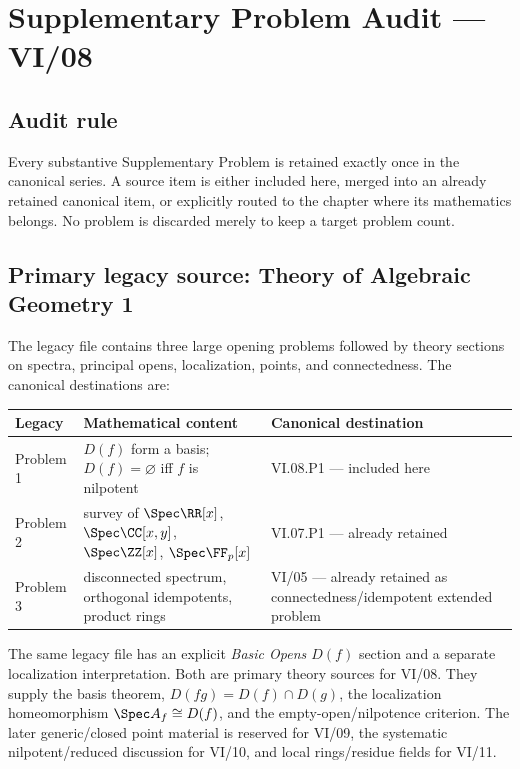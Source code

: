 \chapter*{Supplementary Problem Audit --- VI/08}

\section*{Audit rule}
Every substantive Supplementary Problem is retained exactly once in the canonical series.  A source
item is either included here, merged into an already retained canonical item, or explicitly
routed to the chapter where its mathematics belongs.  No problem is discarded merely to
keep a target problem count.

\section*{Primary legacy source: Theory of Algebraic Geometry 1}
The legacy file contains three large opening problems followed by theory sections on spectra,
principal opens, localization, points, and connectedness.  The canonical destinations are:

\begin{center}
\renewcommand{\arraystretch}{1.2}
\begin{tabular}{p{}p{}p{}}
\toprule
\textbf{Legacy} & \textbf{Mathematical content} & \textbf{Canonical destination}\\
\midrule
Problem 1 & $D(f)$ form a basis; $D(f)=\varnothing$ iff $f$ is nilpotent & VI.08.P1 --- included here\\
Problem 2 & survey of $\Spec\RR[x]$, $\Spec\CC[x,y]$, $\Spec\ZZ[x]$, $\Spec\FF_p[x]$ & VI.07.P1 --- already retained\\
Problem 3 & disconnected spectrum, orthogonal idempotents, product rings & VI/05 --- already retained as connectedness/idempotent extended problem\\
\bottomrule
\end{tabular}
\end{center}

The same legacy file has an explicit \emph{Basic Opens $D(f)$} section and a separate
localization interpretation.  Both are primary theory sources for VI/08.  They supply the
basis theorem, $D(fg)=D(f)\cap D(g)$, the localization homeomorphism
$\Spec A_f\cong D(f)$, and the empty-open/nilpotence criterion.  The later generic/closed
point material is reserved for VI/09, the systematic nilpotent/reduced discussion for
VI/10, and local rings/residue fields for VI/11.

